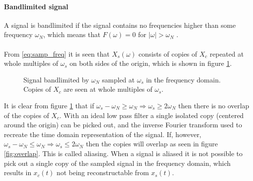 \paragraph{Bandlimited signal}
A signal is bandlimited if the signal contains no frequencies higher than some frequency $\omega_N$, which means that $F(\omega) = 0$ for $|\omega|>\omega_N$ \cite{page 230, FAA}.
\\\\
From \eqref{eq:samp_freq} it is seen that $X_s(\omega)$ consists of copies of $X_c$ repeated at whole multiples of $\omega_s$ on both sides of the origin, which is shown in figure \ref{fig:copies}.
\begin{figure}[H]
\centering
{}
\caption{Signal bandlimited by $\omega_N$ sampled at $\omega_s$ in the frequency domain. Copies of $X_c$ are seen at whole multiples of $\omega_s$.}
\label{fig:copies}
\end{figure}

It is clear from figure \ref{fig:copies} that if $\omega_s-\omega_N\geq \omega_N\Rightarrow \omega_s\geq 2\omega_N$ then there is no overlap of the copies of $X_c$. With an ideal low pass filter  a single isolated copy (centered around the origin) can be picked out, and the inverse Fourier transform used to recreate the time domain representation of the signal. If, however, $\omega_s-\omega_N\leq \omega_N\Rightarrow \omega_s\leq 2\omega_N$ then the copies will overlap as seen in figure \ref{fig:overlap}. This is called aliasing. When a signal is aliased it is not possible to pick out a single copy of the sampled signal in the frequency domain, which results in $x_c(t)$ not being reconstructable from $x_s(t)$.

